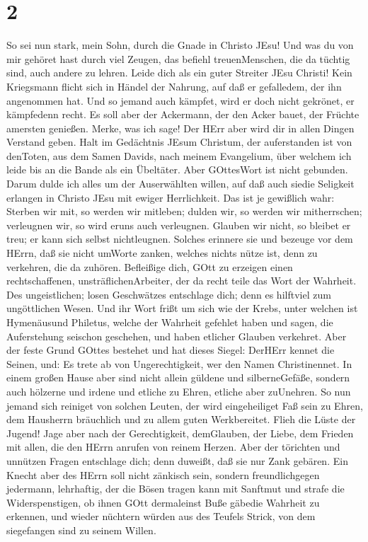 \hypertarget{section-1}{%
\section{2}\label{section-1}}

 So sei nun stark, mein Sohn, durch die Gnade in Christo
JEsu!  Und was du von mir gehöret hast durch viel Zeugen,
das befiehl treuenMenschen, die da tüchtig sind, auch andere zu lehren.
 Leide dich als ein guter Streiter JEsu Christi!
 Kein Kriegsmann flicht sich in Händel der Nahrung, auf daß
er gefalledem, der ihn angenommen hat.  Und so jemand auch
kämpfet, wird er doch nicht gekrönet, er kämpfedenn recht. 
Es soll aber der Ackermann, der den Acker bauet, der Früchte amersten
genießen. Merke, was ich sage!  Der HErr aber wird dir in
allen Dingen Verstand geben.  Halt im Gedächtnis JEsum
Christum, der auferstanden ist von denToten, aus dem Samen Davids, nach
meinem Evangelium,  über welchem ich leide bis an die Bande
als ein Übeltäter. Aber GOttesWort ist nicht gebunden. 
Darum dulde ich alles um der Auserwählten willen, auf daß auch siedie
Seligkeit erlangen in Christo JEsu mit ewiger Herrlichkeit.
 Das ist je gewißlich wahr: Sterben wir mit, so werden wir
mitleben;  dulden wir, so werden wir mitherrschen;
verleugnen wir, so wird eruns auch verleugnen.  Glauben wir
nicht, so bleibet er treu; er kann sich selbst nichtleugnen.
 Solches erinnere sie und bezeuge vor dem HErrn, daß sie
nicht umWorte zanken, welches nichts nütze ist, denn zu verkehren, die
da zuhören.  Befleißige dich, GOtt zu erzeigen einen
rechtschaffenen, unsträflichenArbeiter, der da recht teile das Wort der
Wahrheit.  Des ungeistlichen; losen Geschwätzes entschlage
dich; denn es hilftviel zum ungöttlichen Wesen.  Und ihr
Wort frißt um sich wie der Krebs, unter welchen ist Hymenäusund
Philetus,  welche der Wahrheit gefehlet haben und sagen,
die Auferstehung seischon geschehen, und haben etlicher Glauben
verkehret.  Aber der feste Grund GOttes bestehet und hat
dieses Siegel: DerHErr kennet die Seinen, und: Es trete ab von
Ungerechtigkeit, wer den Namen Christinennet.  In einem
großen Hause aber sind nicht allein güldene und silberneGefäße, sondern
auch hölzerne und irdene und etliche zu Ehren, etliche aber zuUnehren.
 So nun jemand sich reiniget von solchen Leuten, der wird
eingeheiliget Faß sein zu Ehren, dem Hausherrn bräuchlich und zu allem
guten Werkbereitet.  Flieh die Lüste der Jugend! Jage aber
nach der Gerechtigkeit, demGlauben, der Liebe, dem Frieden mit allen,
die den HErrn anrufen von reinem Herzen.  Aber der
törichten und unnützen Fragen entschlage dich; denn duweißt, daß sie nur
Zank gebären.  Ein Knecht aber des HErrn soll nicht
zänkisch sein, sondern freundlichgegen jedermann, lehrhaftig, der die
Bösen tragen kann mit Sanftmut  und strafe die
Widerspenstigen, ob ihnen GOtt dermaleinst Buße gäbedie Wahrheit zu
erkennen,  und wieder nüchtern würden aus des Teufels
Strick, von dem siegefangen sind zu seinem Willen.

